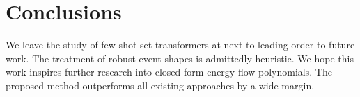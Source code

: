 \section{Conclusions}\label{sec:conclusions}

We leave the study of few-shot set transformers at next-to-leading order
to future work. The treatment of robust event shapes is admittedly
heuristic. We hope this work inspires further research into closed-form
energy flow polynomials. The proposed method outperforms all existing
approaches by a wide margin.

